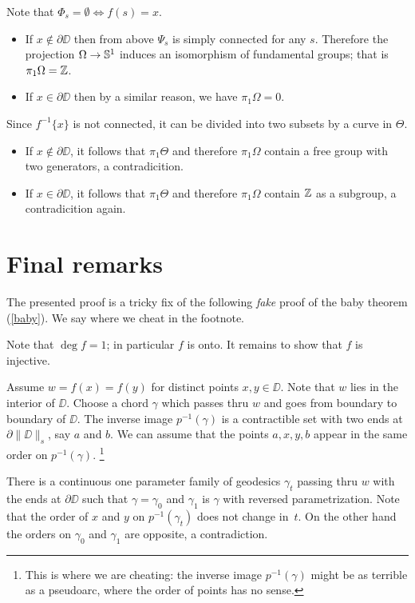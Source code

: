 \documentclass{article}
\begin{document}
Note that $\Phi_s=\emptyset\iff f(s)=x$.
\begin{itemize}
\item If $x\notin\partial\DD$ then from above $\Psi_s$ is simply connected for any $s$.
Therefore the projection $\Omega\to \mathbb{S}^1$ induces an isomorphism of fundamental groups; that is $\pi_1\Omega=\mathbb{Z}$.
\item If $x\in\partial\DD$ then by a similar reason, we have $\pi_1\Omega=0$.
\end{itemize}



Since $f^{-1}\{x\}$ is not connected, it can be divided into two subsets by a curve in $\Theta$.
\begin{itemize}
\item If $x\notin\partial \DD$, it follows that $\pi_1\Theta$ and therefore $\pi_1\Omega$ contain a free group with two generators, a contradicition.
\item If $x\in\partial\DD$, it follows that $\pi_1\Theta$ and therefore $\pi_1\Omega$ contain $\mathbb{Z}$ as a subgroup, a contradicition again.\qeds
\end{itemize}


\section{Final remarks}

The presented proof is a tricky fix of the following \emph{fake} proof of the baby theorem (\ref{baby}).
We say where we cheat in the footnote.

Note that  $\deg f=1$;
in particular $f$ is onto.
It remains to show that $f$ is injective.

Assume  $w=f(x)=f(y)$ for distinct points $x,y\in\DD$.
Note that  $w$ lies in the interior of $\DD$.
Choose a chord $\gamma$ which passes thru $w$ and goes 
from boundary to boundary of $\DD$.
The inverse image $p^{-1}(\gamma)$ is a contractible set with two ends at $\partial\|\DD\|_s$, say $a$ and $b$.
We can assume that the points $a,x,y,b$ appear in the same order on $p^{-1}(\gamma)$.
\footnote{This is where we are cheating: the inverse image $p^{-1}(\gamma)$ might be as terrible as a pseudoarc, 
where the order of points has no sense.}

There is a continuous one parameter family of geodesics $\gamma_t$ passing thru $w$ with the ends at $\partial \DD$
such that $\gamma=\gamma_0$ and $\gamma_1$ is $\gamma$ with reversed parametrization.
Note that the order of $x$ and $y$ on $p^{-1}(\gamma_t)$ does not change in~$t$.
On the other hand the orders on $\gamma_0$ and $\gamma_1$ are opposite, a contradiction.\qeds
\end{document}

